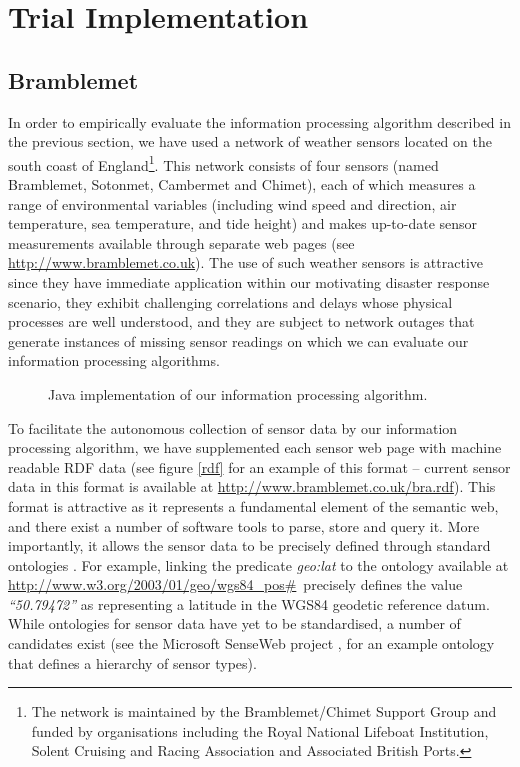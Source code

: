 \documentclass{acmtrans2m}
\begin{document}
\section{Trial Implementation}\label{sec_implementation}

\subsection{Bramblemet}

\noindent In order to empirically evaluate the information processing algorithm described in the previous section, we have used a network of weather sensors located on the south coast of England\footnote{The network is maintained by the Bramblemet/Chimet Support Group and funded by organisations including the Royal National Lifeboat Institution, Solent Cruising and Racing Association and Associated British Ports.}. This network consists of four sensors (named Bramblemet, Sotonmet, Cambermet and Chimet), each of which measures a range of environmental variables (including wind speed and direction, air temperature, sea temperature, and tide height) and makes up-to-date sensor measurements available through separate web pages (see \small\url{http://www.bramblemet.co.uk}\normalsize). The use of such weather sensors is attractive since they have immediate application within our motivating disaster response scenario, they exhibit challenging correlations and delays whose physical processes are well understood, and they are subject to network outages that generate instances of missing sensor readings on which we can evaluate our information processing algorithms.

\begin{figure}[tp!]
\begin{center}
\caption{Java implementation of our information processing algorithm.}
\label{screen}
\end{center}
\end{figure}

To facilitate the autonomous collection of sensor data by our information processing algorithm, we have supplemented each sensor web page with machine readable RDF data (see figure \ref{rdf} for an example of this format -- current sensor data in this format is available at \small\url{http://www.bramblemet.co.uk/bra.rdf}\normalsize). This format is attractive as it represents a fundamental element of the semantic web, and there exist a number of software tools to parse, store and query it. More importantly, it allows the sensor data to be precisely defined through standard ontologies \cite{rdf,semantic}. For example, linking the predicate {\em geo:lat} to the ontology available at \small\url{http://www.w3.org/2003/01/geo/wgs84_pos#}\normalsize ~precisely defines the value {\em ``50.79472''} as representing a latitude in the WGS84 geodetic reference datum. While ontologies for sensor data have yet to be standardised, a number of candidates exist (see the Microsoft SenseWeb project \cite{senseweb}, for an example ontology that defines a hierarchy of sensor types).
\end{document}
